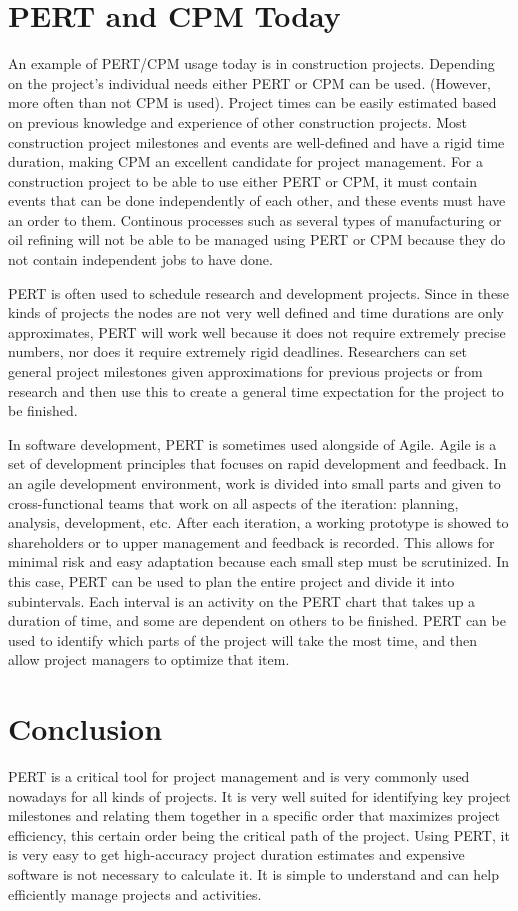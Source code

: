 \documentclass[12pt]{article}
\begin{document}
\section{PERT and CPM Today}
An example of PERT/CPM usage today is in construction projects.
Depending on the project's individual needs either PERT or CPM can be used.
(However, more often than not CPM is used).
Project times can be easily estimated based on previous knowledge and experience of other construction projects.
Most construction project milestones and events are well-defined and have a rigid time duration, making CPM an excellent candidate for project management.
For a construction project to be able to use either PERT or CPM, it must contain events that can be done independently of each other, and these events must have an order to them.
Continous processes such as several types of manufacturing or oil refining will not be able to be managed using PERT or CPM because they do not contain independent jobs to have done.

PERT is often used to schedule research and development projects.  Since in these kinds of projects the nodes are not very well defined and time durations are only approximates, PERT will work well because it does not require extremely precise numbers, nor does it require extremely rigid deadlines.  Researchers can set general project milestones given approximations for previous projects or from research and then use this to create a general time expectation for the project to be finished.  

In software development, PERT is sometimes used alongside of Agile.  Agile is a set of development principles that focuses on rapid development and feedback.  In an agile development environment, work is divided into small parts and given to cross-functional teams that work on all aspects of the iteration: planning, analysis, development, etc.  After each iteration, a working prototype is showed to shareholders or to upper management and feedback is recorded.  This allows for minimal risk and easy adaptation because each small step must be scrutinized.  In this case, PERT can be used to plan the entire project and divide it into subintervals.  Each interval is an activity on the PERT chart that takes up a duration of time, and some are dependent on others to be finished.
PERT can be used to identify which parts of the project will take the most time, and then allow project managers to optimize that item.


\section{Conclusion}
PERT is a critical tool for project management and is very commonly used nowadays for all kinds of projects.
It is very well suited for identifying key project milestones and relating them together in a specific order that maximizes project efficiency, this certain order being the critical path of the project.  Using PERT, it is very easy to get high-accuracy project duration estimates and expensive software is not necessary to calculate it.  It is simple to understand and can help efficiently manage projects and activities.  
\end{document}
